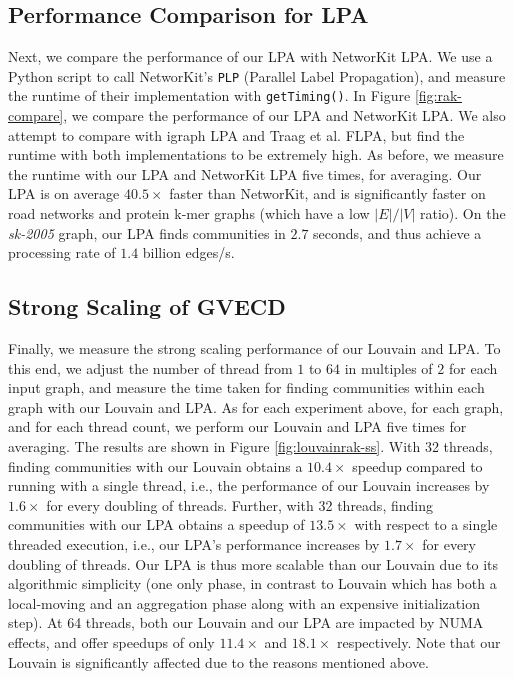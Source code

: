 \subsection{Performance Comparison for LPA}

Next, we compare the performance of our LPA with NetworKit LPA. We use a Python script to call NetworKit's \texttt{PLP} (Parallel Label Propagation), and measure the runtime of their implementation with \texttt{getTiming()}. In Figure \ref{fig:rak-compare}, we compare the performance of our LPA and NetworKit LPA. We also attempt to compare with igraph LPA and Traag et al. FLPA, but find the runtime with both implementations to be extremely high. As before, we measure the runtime with our LPA and NetworKit LPA five times, for averaging. Our LPA is on average $40.5\times$ faster than NetworKit, and is significantly faster on road networks and protein k-mer graphs (which have a low $|E|/|V|$ ratio). On the \textit{sk-2005} graph, our LPA finds communities in $2.7$ seconds, and thus achieve a processing rate of $1.4$ billion edges/s.




\subsection{Strong Scaling of GVECD}

Finally, we measure the strong scaling performance of our Louvain and LPA. To this end, we adjust the number of thread from $1$ to $64$ in multiples of $2$ for each input graph, and measure the time taken for finding communities within each graph with our Louvain and LPA. As for each experiment above, for each graph, and for each thread count, we perform our Louvain and LPA five times for averaging. The results are shown in Figure \ref{fig:louvainrak-ss}. With 32 threads, finding communities with our Louvain obtains a $10.4\times$ speedup compared to running with a single thread, i.e., the performance of our Louvain increases by $1.6\times$ for every doubling of threads. Further, with 32 threads, finding communities with our LPA obtains a speedup of $13.5\times$ with respect to a single threaded execution, i.e., our LPA's performance increases by $1.7\times$ for every doubling of threads. Our LPA is thus more scalable than our Louvain due to its algorithmic simplicity (one only phase, in contrast to Louvain which has both a local-moving and an aggregation phase along with an expensive initialization step). At 64 threads, both our Louvain and our LPA are impacted by NUMA effects, and offer speedups of only $11.4\times$ and $18.1\times$ respectively. Note that our Louvain is significantly affected due to the reasons mentioned above.
